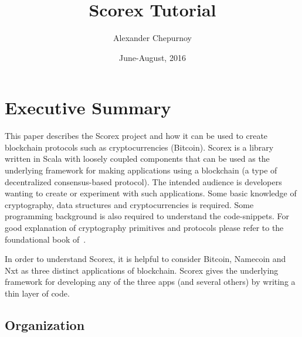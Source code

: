 \documentclass[]{report}   %
\begin{document}
%

\title{Scorex Tutorial}
\author{Alexander Chepurnoy}         
\date{June-August, 2016}
\maketitle



\chapter{Executive Summary}

This paper describes the Scorex project and how it can be used to create blockchain protocols such as cryptocurrencies (Bitcoin). Scorex is a library written in Scala with loosely coupled components that can be used as the underlying framework for making applications using a blockchain (a type of decentralized consensus-based protocol). 
The intended audience is developers wanting to create or experiment with such applications. Some basic knowledge of cryptography, data structures and cryptocurrencies is required. Some programming background is also required to understand the code-snippets. For good explanation of cryptography primitives and protocols please refer to the foundational book of~\cite{katz2014introduction}. 

In order to understand Scorex, it is helpful to consider Bitcoin, Namecoin and Nxt as three distinct applications of blockchain. Scorex gives the underlying framework for developing any of the three apps (and several others) by writing a thin layer of code. 



\section{Organization}
\end{document}
